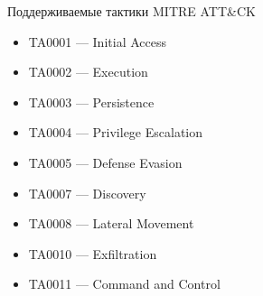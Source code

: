 \begin{frame}{Поддерживаемые тактики MITRE ATT\&CK}
    \begin{itemize}
    \item TA0001 — Initial Access
    \item TA0002 — Execution
    \item TA0003 — Persistence
    \item TA0004 — Privilege Escalation
    \item TA0005 — Defense Evasion
    \item TA0007 — Discovery
    \item TA0008 — Lateral Movement
    \item TA0010 — Exfiltration
    \item TA0011 — Command and Control
    \end{itemize}
\end{frame}

